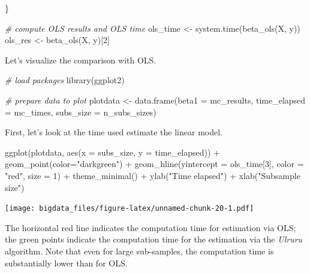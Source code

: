 \documentclass[
  12pt,
]{style/krantz}
\newenvironment{Shaded}{\begin{snugshade}}{\end{snugshade}}
\newcommand{\AttributeTok}[1]{\textcolor[rgb]{0.77,0.63,0.00}{#1}}
\newcommand{\CommentTok}[1]{\textcolor[rgb]{0.56,0.35,0.01}{\textit{#1}}}
\newcommand{\DecValTok}[1]{\textcolor[rgb]{0.00,0.00,0.81}{#1}}
\newcommand{\FunctionTok}[1]{\textcolor[rgb]{0.00,0.00,0.00}{#1}}
\newcommand{\NormalTok}[1]{#1}
\newcommand{\OtherTok}[1]{\textcolor[rgb]{0.56,0.35,0.01}{#1}}
\newcommand{\SpecialCharTok}[1]{\textcolor[rgb]{0.00,0.00,0.00}{#1}}
\newcommand{\StringTok}[1]{\textcolor[rgb]{0.31,0.60,0.02}{#1}}
\begin{document}
\begin{Shaded}
\begin{Highlighting}[]
\NormalTok{\}}

\CommentTok{\# compute OLS results and OLS time}
\NormalTok{ols\_time }\OtherTok{\textless{}{-}} \FunctionTok{system.time}\NormalTok{(}\FunctionTok{beta\_ols}\NormalTok{(X, y))}
\NormalTok{ols\_res }\OtherTok{\textless{}{-}} \FunctionTok{beta\_ols}\NormalTok{(X, y)[}\DecValTok{2}\NormalTok{]}
\end{Highlighting}
\end{Shaded}

Let's visualize the comparison with OLS.

\begin{Shaded}
\begin{Highlighting}[]
\CommentTok{\# load packages}
\FunctionTok{library}\NormalTok{(ggplot2)}

\CommentTok{\# prepare data to plot}
\NormalTok{plotdata }\OtherTok{\textless{}{-}} \FunctionTok{data.frame}\NormalTok{(}\AttributeTok{beta1 =}\NormalTok{ mc\_results,}
                       \AttributeTok{time\_elapsed =}\NormalTok{ mc\_times,}
                       \AttributeTok{subs\_size =}\NormalTok{ n\_subs\_sizes)}
\end{Highlighting}
\end{Shaded}

First, let's look at the time used estimate the linear model.

\begin{Shaded}
\begin{Highlighting}[]
\FunctionTok{ggplot}\NormalTok{(plotdata, }\FunctionTok{aes}\NormalTok{(}\AttributeTok{x =}\NormalTok{ subs\_size, }\AttributeTok{y =}\NormalTok{ time\_elapsed)) }\SpecialCharTok{+}
     \FunctionTok{geom\_point}\NormalTok{(}\AttributeTok{color=}\StringTok{"darkgreen"}\NormalTok{) }\SpecialCharTok{+} 
     \FunctionTok{geom\_hline}\NormalTok{(}\AttributeTok{yintercept =}\NormalTok{ ols\_time[}\DecValTok{3}\NormalTok{],}
                \AttributeTok{color =} \StringTok{"red"}\NormalTok{, }
                \AttributeTok{size =} \DecValTok{1}\NormalTok{) }\SpecialCharTok{+}
     \FunctionTok{theme\_minimal}\NormalTok{() }\SpecialCharTok{+}
     \FunctionTok{ylab}\NormalTok{(}\StringTok{"Time elapsed"}\NormalTok{) }\SpecialCharTok{+}
     \FunctionTok{xlab}\NormalTok{(}\StringTok{"Subsample size"}\NormalTok{)}
\end{Highlighting}
\end{Shaded}

\texttt{[image: bigdata\_files/figure-latex/unnamed-chunk-20-1.pdf]}

The horizontal red line indicates the computation time for estimation via OLS; the green points indicate the computation time for the estimation via the \emph{Ulruru} algorithm. Note that even for large sub-samples, the computation time is substantially lower than for OLS.
\end{document}
